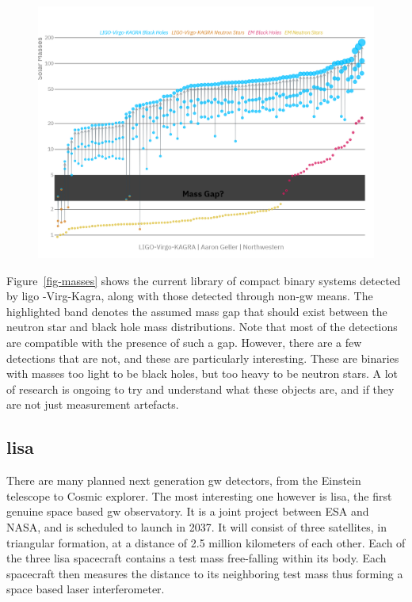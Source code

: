 \documentclass[
  11pt,
  a4paper,
  DIV=11,
  numbers=noendperiod,
  twoside]{scrreprt}
\DeclareRobustCommand{\[}{\begin{equation}}
\DeclareRobustCommand{\]}{\end{equation}}
\begin{document}
\begin{figure}


{\centering \includegraphics{./Masses_of_Dead_Stars_LIGO_Virgo_KAGRA.png}

}

\end{figure}

Figure~\ref{fig-masses} shows the current library of compact binary
systems detected by \gls{ligo} -Virg-Kagra, along with those detected
through non-\gls{gw} means. The highlighted band denotes the assumed
mass gap that should exist between the neutron star and black hole mass
distributions. Note that most of the detections are compatible with the
presence of such a gap. However, there are a few detections that are
not, and these are particularly interesting. These are binaries with
masses too light to be black holes, but too heavy to be neutron stars. A
lot of research is ongoing to try and understand what these objects are,
and if they are not just measurement artefacts.

\hypertarget{lisa}{%
\subsection{\texorpdfstring{\gls{lisa}}{}}\label{lisa}}

There are many planned next generation \gls{gw} detectors, from the
Einstein telescope to Cosmic explorer. The most interesting one however
is \gls{lisa}, the first genuine space based \gls{gw} observatory. It is
a joint project between ESA and NASA, and is scheduled to launch in
2037. It will consist of three satellites, in triangular formation, at a
distance of 2.5 million kilometers of each other. Each of the three
\gls{lisa} spacecraft contains a test mass free-falling within its body.
Each spacecraft then measures the distance to its neighboring test mass
thus forming a space based laser interferometer.
\end{document}
